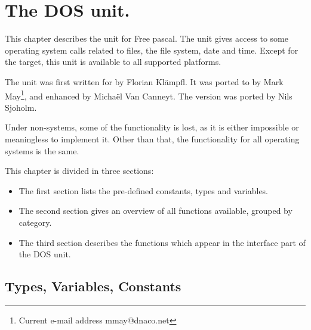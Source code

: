 %
%
%
%
%
\chapter{The DOS unit.}

This chapter describes the  unit for Free pascal. The 
unit gives access to some operating system calls related to files, the
file system, date and time. Except for the \palmos target, this unit is
available to all supported platforms.

The unit was first written for \dos by Florian Kl\"ampfl. It was ported to 
\linux by Mark May\footnote{Current e-mail address \textsf{mmay@dnaco.net}}, 
and enhanced by Micha\"el Van Canneyt. The \amiga version was ported by
Nils Sjoholm.

Under non-\dos systems, some of the functionality is lost, as it is either impossible 
or meaningless to implement it. Other than that, the functionality for all 
operating systems is the same.

This chapter is divided in three sections:
\begin{itemize}
\item The first section lists the pre-defined constants, types and variables. 
\item The second section gives an overview of all functions available,
grouped by category.
\item The third section describes the functions which appear in the
interface part of the DOS unit.
\end{itemize}

\section{Types, Variables, Constants}


